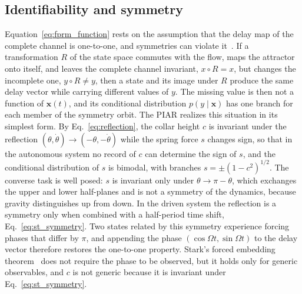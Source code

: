\subsection{Identifiability and symmetry}\label{sec:identifiability}

Equation~\eqref{eq:fprm_function} rests on the assumption that the delay map of the complete channel is one-to-one, and symmetries can violate it~\cite{LetellierAguirre2002,Letellier2005}. If a transformation $R$ of the state space commutes with the flow, maps the attractor onto itself, and leaves the complete channel invariant, $x\circ R=x$, but changes the incomplete one, $y\circ R\ne y$, then a state and its image under $R$ produce the same delay vector while carrying different values of $y$. The missing value is then not a function of $\mathbf x(t)$, and its conditional distribution $p(y\mid\mathbf x)$ has one branch for each member of the symmetry orbit. The PIAR realizes this situation in its simplest form. By Eq.~\eqref{eq:reflection}, the collar height $c$ is invariant under the reflection $(\theta,\dot\theta)\to(-\theta,-\dot\theta)$ while the spring force $s$ changes sign, so that in the autonomous system no record of $c$ can determine the sign of $s$, and the conditional distribution of $s$ is bimodal, with branches $s=\pm(1-c^{2})^{1/2}$. The converse task is well posed: $s$ is invariant only under $\theta\to\pi-\theta$, which exchanges the upper and lower half-planes and is not a symmetry of the dynamics, because gravity distinguishes up from down. In the driven system the reflection is a symmetry only when combined with a half-period time shift, Eq.~\eqref{eq:st_symmetry}. Two states related by this symmetry experience forcing phases that differ by $\pi$, and appending the phase $(\cos\Omega t,\sin\Omega t)$ to the delay vector therefore restores the one-to-one property. Stark's forced embedding theorem~\cite{Stark1999} does not require the phase to be observed, but it holds only for generic observables, and $c$ is not generic because it is invariant under Eq.~\eqref{eq:st_symmetry}.

